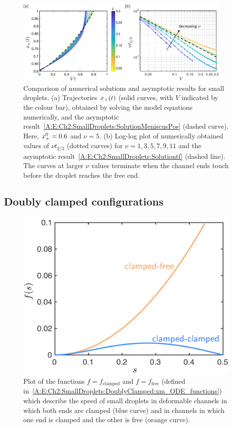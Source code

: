 \begin{subappendices}
\begin{figure}[t]
\centering
\includegraphics[width = 0.95\textwidth]{SmallDropletsAsymptotics}
\caption{Comparison of numerical solutions and asymptotic results for small droplets. (a) Trajectories $x_{+}(t)$ (solid curves, with $V$ indicated by the colour bar), obtained by solving the model equations numerically, and the asymptotic result~\eqref{A:E:Ch2:SmallDroplets:SolutionMeniscusPos} (dashed curve). Here, $x_{+}^0 = 0.6$ and $\nu = 5$. (b) Log-log plot of numerically obtained values of  $\nu t_{2/3}$ (dotted curves) for $\nu = 1,3,5,7,9,11$ and the asymptotic result~\eqref{A:E:Ch2:SmallDroplets:Solutiontf} (dashed line). The curves at larger $\nu$ values terminate when the channel ends touch before the droplet reaches the free end. }\label{A:fig:Ch2:SmallDroplets}
\end{figure}

\subsection{Doubly clamped configurations}

\begin{figure}[t]
\centering
\includegraphics[scale=0.4]{doubly_clamped}
\caption{Plot of the functions $f = f_{\text{clamped}}$ and $f = f_{\text{free}}$ (defined in~\eqref{A:E:Ch2:SmallDroplets:DoublyClamped:xm_ODE_functions}) which describe the speed of small droplets in deformable channels in which both ends are clamped (blue curve) and in channels in which one end is clamped and the other is free (orange curve).}\label{fig:Ch2:Appendix:doubly_clamped}
\end{figure}


\end{subappendices}
